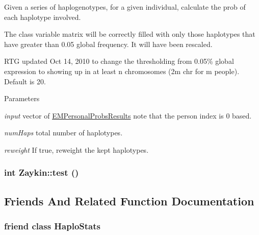 Given a series of haplogenotypes, for a given individual, calculate the prob of each haplotype involved.

The class variable matrix will be correctly filled with only those haplotypes that have greater than 0.05 global frequency. It will have been rescaled.

RTG updated Oct 14, 2010 to change the thresholding from 0.05\% global expression to showing up in at least n chromosomes (2m chr for m people). Default is 20.


\begin{DoxyParams}{Parameters}
\item[{\em input}]vector of \hyperlink{structEMPersonalProbsResults}{EMPersonalProbsResults} note that the person index is 0 based. \item[{\em numHaps}]total number of haplotypes. \item[{\em reweight}]If true, reweight the kept haplotypes. \end{DoxyParams}
\hypertarget{classZaykin_ac26fd52252bbba304828e69e44d0a909}{
\subsubsection[{test}]{\setlength{\rightskip}{0pt plus 5cm}int Zaykin::test ()}}
\label{classZaykin_ac26fd52252bbba304828e69e44d0a909}


\subsection{Friends And Related Function Documentation}
\hypertarget{classZaykin_ab5eb8e85b324a9728c593bdc1ada8198}{
\subsubsection[{HaploStats}]{\setlength{\rightskip}{0pt plus 5cm}friend class {\bf HaploStats}}}
\label{classZaykin_ab5eb8e85b324a9728c593bdc1ada8198}


